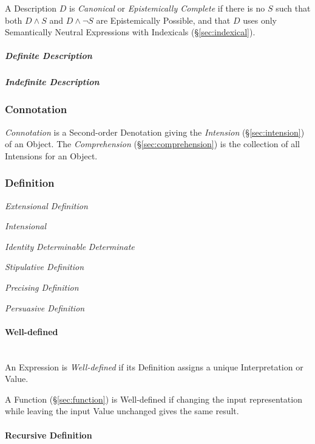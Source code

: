 A Description $D$ is \emph{Canonical} or \emph{Epistemically Complete}
if there is no $S$ such that both $D \wedge S$ and $D \wedge \neg S$
are Epistemically Possible, and that $D$ uses only Semantically
Neutral Expressions with Indexicals (\S\ref{sec:indexical}).

\subparagraph{Definite Description}\label{sec:definite_description}

\subparagraph{Indefinite Description}\label{sec:indefinite_description}



\subsubsection{Connotation}\label{sec:connotation}

\emph{Connotation} is a Second-order Denotation giving the
\emph{Intension} (\S\ref{sec:intension}) of an Object. The
\emph{Comprehension} (\S\ref{sec:comprehension}) is the collection of
all Intensions for an Object.



\subsubsection{Definition}\label{sec:definition}

\emph{Extensional Definition}

\emph{Intensional}

\emph{Identity} \emph{Determinable} \emph{Determinate}

\emph{Stipulative Definition}

\emph{Precising Definition}

\emph{Persuasive Definition}



\paragraph{Well-defined}\label{sec:well_defined}
\hfill \\

An Expression is \emph{Well-defined} if its Definition assigns a
unique Interpretation or Value.

A Function (\S\ref{sec:function}) is Well-defined if changing the
input representation while leaving the input Value unchanged gives the
same result.



\paragraph{Recursive Definition}\label{sec:recursive_definition}
\hfill \\


